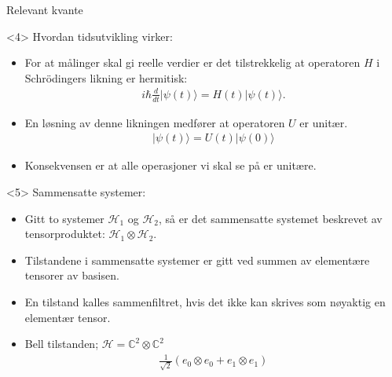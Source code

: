 \documentclass[norsk]{beamer}
\begin{document}
\begin{frame}{Relevant kvante}
		\begin{onlyenv}<4>
			Hvordan tidsutvikling virker:
			\begin{itemize}
				\item For at målinger skal gi reelle verdier er det tilstrekkelig at operatoren $H$ i Schrödingers likning er hermitisk:
				\begin{align*}
					i\hbar\frac{d}{dt}|\psi(t)\rangle = H(t)|\psi(t)\rangle.
				\end{align*}
				\item En løsning av denne likningen medfører at operatoren $U$ er unitær.
				\begin{align*}
						|\psi(t)\rangle = U(t)|\psi(0)\rangle
				\end{align*}
				\item Konsekvensen er at alle operasjoner vi skal se på er unitære.
			\end{itemize}
		\end{onlyenv}

		\begin{onlyenv}<5>
			Sammensatte systemer:
			\begin{itemize}
				\item Gitt to systemer $\mathcal{H}_1$ og $\mathcal{H}_2$, så er det sammensatte systemet beskrevet av tensorproduktet: $\mathcal{H}_1\otimes\mathcal{H}_2$.
				\item Tilstandene i sammensatte systemer er gitt ved summen av elementære tensorer av basisen.
				\item En tilstand kalles sammenfiltret, hvis det ikke kan skrives som nøyaktig en elementær tensor.
				\item Bell tilstanden; $\mathcal{H}=\mathbb{C}^2\otimes\mathbb{C}^2$
				\begin{align*}
					\frac{1}{\sqrt{2}}(e_0\otimes e_0 + e_1\otimes e_1)
				\end{align*}
			\end{itemize}
		\end{onlyenv}
	\end{frame}
\end{document}

